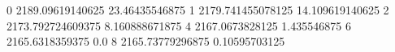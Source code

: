 0 2189.09619140625 23.46435546875
1 2179.741455078125 14.109619140625
2 2173.792724609375 8.160888671875
4 2167.0673828125 1.435546875
6 2165.6318359375 0.0
8 2165.73779296875 0.10595703125
